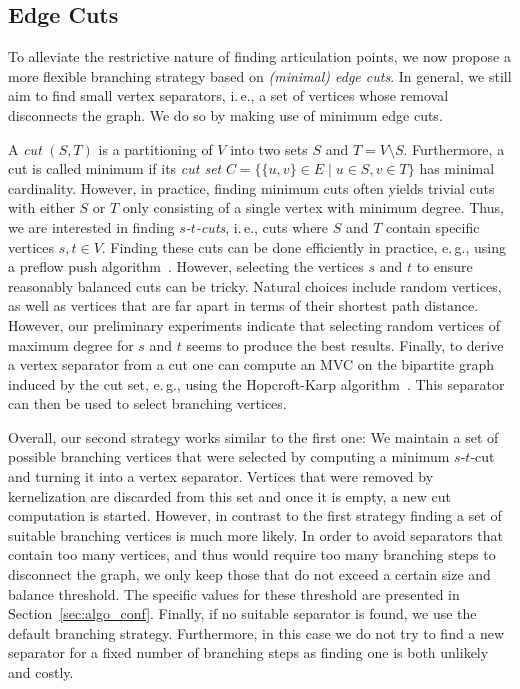\documentclass[a4paper,UKenglish,cleveref, autoref, thm-restate]{lipics-v2021}
\newcommand{\ie}{i.\,e.,\xspace}
\newcommand{\eg}{e.\,g.,\xspace}
\begin{document}
\subsection{Edge Cuts}
To alleviate the restrictive nature of finding articulation points, we now propose a more flexible branching strategy based on \emph{(minimal) edge cuts}.
In general, we still aim to find small vertex separators, \ie a set of vertices whose removal disconnects the graph.
We do so by making use of minimum edge cuts.

A \emph{cut} $(S,T)$ is a partitioning of $V$ into two sets $S$ and $T=V\setminus S$.
Furthermore, a cut is called minimum if its \emph{cut set} $C = \{\{u,v\} \in E \mid u \in S, v \in T\}$ has minimal cardinality.
However, in practice, finding minimum cuts often yields trivial cuts with either $S$ or $T$ only consisting of a single vertex with minimum degree. 
Thus, we are interested in finding \emph{$s$-$t$-cuts}, \ie cuts where $S$ and $T$ contain specific vertices $s,t \in V$.
Finding these cuts can be done efficiently in practice, \eg using a preflow push algorithm~\cite{goldberg1988new}.
However, selecting the vertices $s$ and $t$ to ensure reasonably balanced cuts can be tricky.
Natural choices include random vertices, as well as vertices that are far apart in terms of their shortest path distance.
However, our preliminary experiments indicate that selecting random vertices of maximum degree
 for $s$ and $t$ seems to produce the best results.
Finally, to derive a vertex separator from a cut one can compute an MVC on the bipartite graph induced by the cut set, \eg using the Hopcroft-Karp algorithm~\cite{hopcroft1973n}.
This separator can then be used to select branching vertices.

Overall, our second strategy works similar to the first one: We maintain a set of possible branching vertices that were selected by computing a minimum $s$-$t$-cut and turning it into a vertex separator.
Vertices that were removed by kernelization are discarded from this set and once it is empty, a new cut computation is started.
However, in contrast to the first strategy finding a set of suitable branching vertices is much more likely.
In order to avoid separators that contain too many vertices, and thus would require too many branching steps to disconnect the graph, we only keep those that do not exceed a certain size and balance threshold.
The specific values for these threshold are presented in Section~\ref{sec:algo_conf}.
Finally, if no suitable separator is found, we use the default branching strategy.
Furthermore, in this case we do not try to find a new separator for a fixed number of branching steps as finding one is both unlikely and costly.
\end{document}

